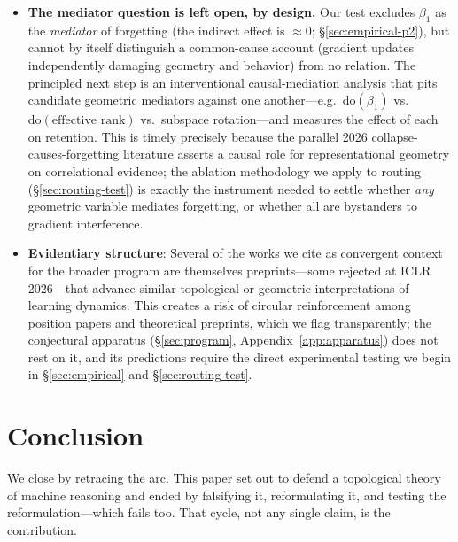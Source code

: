 \documentclass{article}
\begin{document}
\begin{itemize}
    on one readout: the $L/2$ layer at the last token. The layer scan establishing $L/2$ as the
    unique locus of persistent $H_1$ structure was performed only at $0.5$B scale; if larger
    models host persistent structure at other depths, the nulls reported here are statements
    about $L/2$, not about the model. Likewise, ``reasoning'' is operationalized throughout as
    grade-school mathematical word problems (GSM8K-class); the falsifications quantify that
    domain.
    \item \textbf{The mediator question is left open, by design.} Our test excludes $\beta_1$ as the \emph{mediator} of forgetting (the indirect effect is $\approx 0$; \S\ref{sec:empirical-p2}), but cannot by itself distinguish a common-cause account (gradient updates independently damaging geometry and behavior) from no relation. The principled next step is an interventional causal-mediation analysis \citep{Vig2020causal,MuellerMediator2024} that pits candidate geometric mediators against one another---e.g.\ $\mathrm{do}(\beta_1)$ vs.\ $\mathrm{do}(\text{effective rank})$ vs.\ subspace rotation---and measures the effect of each on retention. This is timely precisely because the parallel 2026 collapse-causes-forgetting literature \citep{erankCF,Imanov2026forgetting} asserts a causal role for representational geometry on correlational evidence; the ablation methodology we apply to routing (\S\ref{sec:routing-test}) is exactly the instrument needed to settle whether \emph{any} geometric variable mediates forgetting, or whether all are bystanders to gradient interference.
    \item \textbf{Evidentiary structure}: Several of the works we cite as convergent context for the broader program are themselves preprints---some rejected at ICLR 2026---that advance similar topological or geometric interpretations of learning dynamics. This creates a risk of circular reinforcement among position papers and theoretical preprints, which we flag transparently; the conjectural apparatus (\S\ref{sec:program}, Appendix~\ref{app:apparatus}) does not rest on it, and its predictions require the direct experimental testing we begin in \S\ref{sec:empirical} and \S\ref{sec:routing-test}.
\end{itemize}


\section{Conclusion}

We close by retracing the arc. This paper set out to defend a topological theory of machine
reasoning and ended by falsifying it, reformulating it, and testing the reformulation---which fails
too. That cycle, not any single claim, is the contribution.
\end{document}
